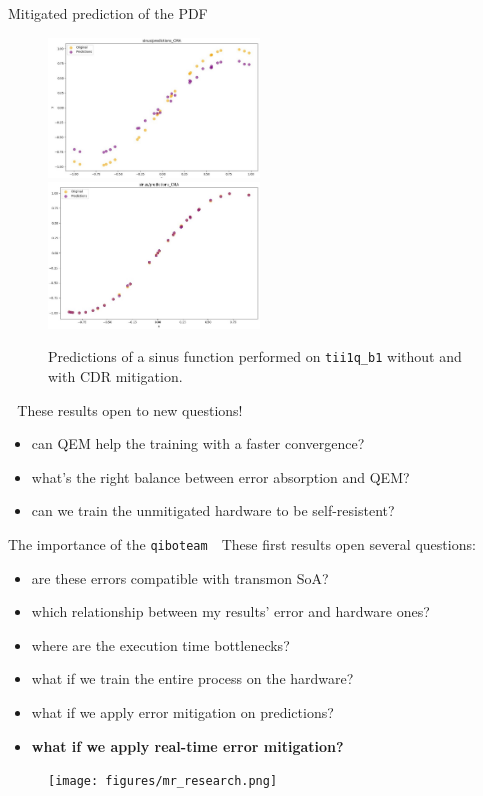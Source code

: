 \documentclass[8pt, xcolor={svgnames}, hyperref={colorlinks, linkcolor=black, citecolor=amethyst, urlcolor=amethyst}]{beamer}
\begin{document}
\begin{frame}{Mitigated prediction of the PDF}
    \begin{figure}
    \includegraphics[width=0.5\textwidth]{figures/no_mit.jpeg}%
    \includegraphics[width=0.5\textwidth]{figures/mit.jpeg}%
    \caption{Predictions of a sinus function performed on \texttt{tii1q\_b1} without
    and with CDR mitigation.}
    \end{figure}
\faArrowCircleRight\,\, These results open to new questions!
\begin{itemize}[noitemsep]
\pause
    \item[\scriptsize\faSquare] can QEM help the training with a faster convergence?
\pause
    \item[\scriptsize\faSquare] what's the right balance between error absorption and QEM?
\pause
    \item[\scriptsize\faSquare] can we train the unmitigated hardware to be self-resistent?
\end{itemize}
\end{frame}

\begin{frame}{The importance of the \texttt{qiboteam}}
\faArrowCircleRight\,\, These first results open several questions:
\begin{itemize}[noitemsep]
    \item[\footnotesize\faSquare] are these errors compatible with transmon SoA?
    \item[\footnotesize\faSquare] which relationship between my results' error and hardware ones?
    \item[\footnotesize\faSquare] where are the execution time bottlenecks?
    \item[\footnotesize\faSquare] what if we train 
    the entire process on the hardware?
    \item[\footnotesize\faSquare] what if we apply error mitigation on predictions?
    \item[\footnotesize\faSquare] \textcolor{amethyst}{\textbf{what if we apply real-time error mitigation?}}
\end{itemize}
\begin{figure}
    \texttt{[image: figures/mr\_research.png]}
\end{figure}
\end{frame}
\end{document}
